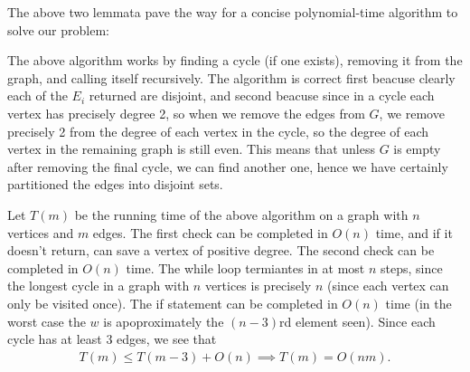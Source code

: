 \documentclass[12pt]{article}
\theoremstyle{definitionstyle}
\begin{document}
\begin{enumerate}[leftmargin=\labelsep]
        The above two lemmata pave the way for a concise polynomial-time algorithm to solve our problem:

        \begin{algorithm}[H]
            \SetAlgoLined


        \end{algorithm}
        
        The above algorithm works by finding a cycle (if one exists), removing it from the graph, and calling itself recursively. The algorithm is correct first beacuse clearly each of the $E_i$ returned are disjoint, and second beacuse since in a cycle each vertex has precisely degree 2, so when we remove the edges from $G$, we remove precisely 2 from the degree of each vertex in the cycle, so the degree of each vertex in the remaining graph is still even. This means that unless $G$ is empty after removing the final cycle, we can find another one, hence we have certainly partitioned the edges into disjoint sets. 

        Let $T(m)$ be the running time of the above algorithm on a graph with $n$ vertices and $m$ edges. The first check can be completed in $O(n)$ time, and if it doesn't return, can save a vertex of positive degree. The second check can be completed in $O(n)$ time. The while loop termiantes in at most $n$ steps, since the longest cycle in a graph with $n$ vertices is precisely $n$ (since each vertex can only be visited once). The if statement can be completed in $O(n)$ time (in the worst case the $w$ is apoproximately the $(n-3)$rd element seen). Since each cycle has at least 3 edges, we see that
        \begin{align*}
            T(m) \leq T(m-3) + O(n) \implies T(m) = O(nm).
        \end{align*}




\end{enumerate}
\end{document}
